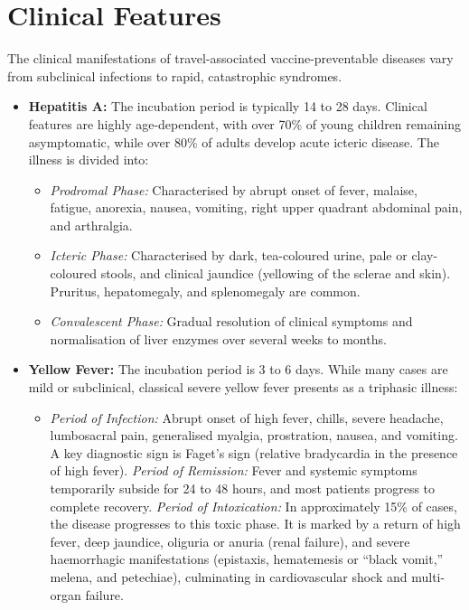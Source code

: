 \section*{Clinical Features}
The clinical manifestations of travel-associated vaccine-preventable diseases vary from subclinical infections to rapid, catastrophic syndromes.
\begin{itemize}
    \item \textbf{Hepatitis A:} The incubation period is typically 14 to 28 days. Clinical features are highly age-dependent, with over 70\% of young children remaining asymptomatic, while over 80\% of adults develop acute icteric disease. The illness is divided into:
    \begin{itemize}
        \item \textit{Prodromal Phase:} Characterised by abrupt onset of fever, malaise, fatigue, anorexia, nausea, vomiting, right upper quadrant abdominal pain, and arthralgia.
        \item \textit{Icteric Phase:} Characterised by dark, tea-coloured urine, pale or clay-coloured stools, and clinical jaundice (yellowing of the sclerae and skin). Pruritus, hepatomegaly, and splenomegaly are common.
        \item \textit{Convalescent Phase:} Gradual resolution of clinical symptoms and normalisation of liver enzymes over several weeks to months.
    \end{itemize}
    \item \textbf{Yellow Fever:} The incubation period is 3 to 6 days. While many cases are mild or subclinical, classical severe yellow fever presents as a triphasic illness:
    \begin{itemize}
        \item \textit{Period of Infection:} Abrupt onset of high fever, chills, severe headache, lumbosacral pain, generalised myalgia, prostration, nausea, and vomiting. A key diagnostic sign is Faget’s sign (relative bradycardia in the presence of high fever).
        \textit{Period of Remission:} Fever and systemic symptoms temporarily subside for 24 to 48 hours, and most patients progress to complete recovery.
        \textit{Period of Intoxication:} In approximately 15\% of cases, the disease progresses to this toxic phase. It is marked by a return of high fever, deep jaundice, oliguria or anuria (renal failure), and severe haemorrhagic manifestations (epistaxis, hematemesis or ``black vomit,'' melena, and petechiae), culminating in cardiovascular shock and multi-organ failure.
    \end{itemize}

\end{itemize}
